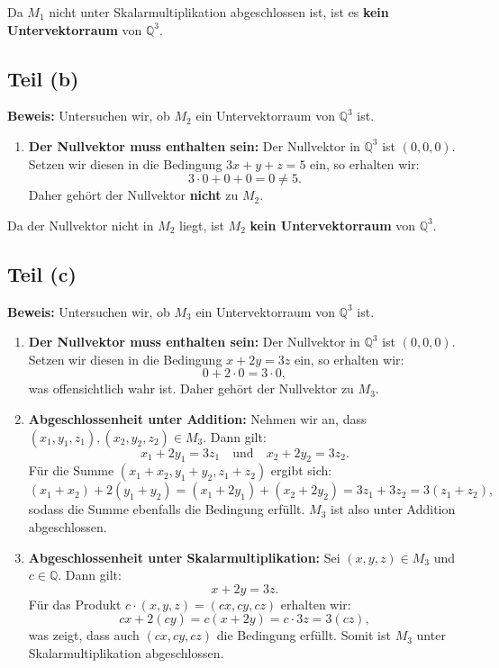 \documentclass[11pt]{article}
\begin{document}
Da \( M_1 \) nicht unter Skalarmultiplikation abgeschlossen ist, ist es \textbf{kein Untervektorraum} von \( \mathbb{Q}^3 \).

\subsection*{Teil (b)}

\textbf{Beweis:} Untersuchen wir, ob \( M_2 \) ein Untervektorraum von \( \mathbb{Q}^3 \) ist.

\begin{enumerate}
    \item \textbf{Der Nullvektor muss enthalten sein:} Der Nullvektor in \( \mathbb{Q}^3 \) ist \((0, 0, 0)\). Setzen wir diesen in die Bedingung \(3x + y + z = 5\) ein, so erhalten wir:
   \[
   3 \cdot 0 + 0 + 0 = 0 \neq 5.
   \]
   Daher gehört der Nullvektor \textbf{nicht} zu \( M_2 \).
\end{enumerate}

Da der Nullvektor nicht in \( M_2 \) liegt, ist \( M_2 \) \textbf{kein Untervektorraum} von \( \mathbb{Q}^3 \).

\subsection*{Teil (c)}

\textbf{Beweis:} Untersuchen wir, ob \( M_3 \) ein Untervektorraum von \( \mathbb{Q}^3 \) ist.

\begin{enumerate}
    \item \textbf{Der Nullvektor muss enthalten sein:} Der Nullvektor in \( \mathbb{Q}^3 \) ist \((0, 0, 0)\). Setzen wir diesen in die Bedingung \(x + 2y = 3z\) ein, so erhalten wir:
   \[
   0 + 2 \cdot 0 = 3 \cdot 0,
   \]
   was offensichtlich wahr ist. Daher gehört der Nullvektor zu \( M_3 \).

    \item \textbf{Abgeschlossenheit unter Addition:} Nehmen wir an, dass \( (x_1, y_1, z_1), (x_2, y_2, z_2) \in M_3 \). Dann gilt:
   \[
   x_1 + 2y_1 = 3z_1 \quad \text{und} \quad x_2 + 2y_2 = 3z_2.
   \]
   Für die Summe \((x_1 + x_2, y_1 + y_2, z_1 + z_2)\) ergibt sich:
   \[
   (x_1 + x_2) + 2(y_1 + y_2) = (x_1 + 2y_1) + (x_2 + 2y_2) = 3z_1 + 3z_2 = 3(z_1 + z_2),
   \]
   sodass die Summe ebenfalls die Bedingung erfüllt. \( M_3 \) ist also unter Addition abgeschlossen.

    \item \textbf{Abgeschlossenheit unter Skalarmultiplikation:} Sei \( (x, y, z) \in M_3 \) und \( c \in \mathbb{Q} \). Dann gilt:
   \[
   x + 2y = 3z.
   \]
   Für das Produkt \( c \cdot (x, y, z) = (cx, cy, cz) \) erhalten wir:
   \[
   cx + 2(cy) = c(x + 2y) = c \cdot 3z = 3(cz),
   \]
   was zeigt, dass auch \( (cx, cy, cz) \) die Bedingung erfüllt. Somit ist \( M_3 \) unter Skalarmultiplikation abgeschlossen.
\end{enumerate}
\end{document}
